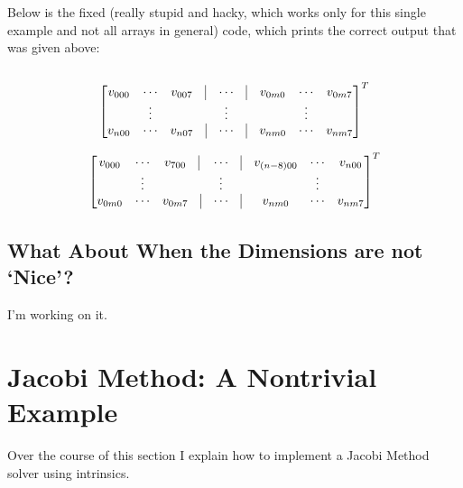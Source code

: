 \documentclass[10pt]{article}
\theoremstyle{definition}
\theoremstyle{plain}
\begin{document}
Below is the fixed (really stupid and hacky, which works only for this single example and not all arrays in general) code, which prints the correct output that was given above:
\inputminted[tabsize=2,breaklines,linenos]{c++}{source/mat_mult_fixed.cpp}

\setcounter{MaxMatrixCols}{16}

\[
\begin{bmatrix}
    v_{000} & \cdots & v_{007}\ \ \ \vline & \cdots & \vline & v_{0m0} & \cdots & v_{0m7} \\

    & \vdots & & \vdots & & & \vdots & \\

    v_{n00} & \cdots & v_{n07}\ \ \ \vline & \cdots & \vline & v_{nm0} & \cdots & v_{nm7} \\
\end{bmatrix}^T
\]

\[
\begin{bmatrix}
    v_{000} & \cdots & v_{700}\ \ \ \vline & \cdots & \vline & v_{(n-8)00} & \cdots & v_{n00} \\

    & \vdots & & \vdots & & & \vdots & \\

    v_{0m0} & \cdots & v_{0m7}\ \ \ \vline & \cdots & \vline & v_{nm0} & \cdots & v_{nm7} \\
\end{bmatrix}^T
\]

\subsection{What About When the Dimensions are not `Nice'?}
I'm working on it.



\pagebreak



\section{Jacobi Method: A Nontrivial Example}
Over the course of this section I explain how to implement a Jacobi Method solver using intrinsics.
\end{document}
